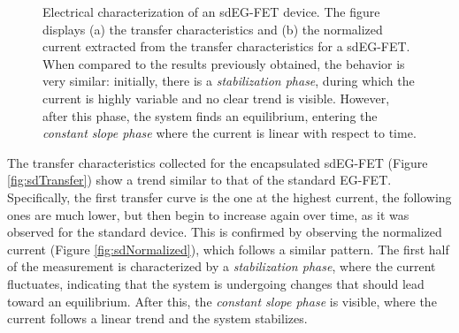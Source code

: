 \begin{figure}
    \centering
    \hfill
    \caption{Electrical characterization of an sdEG-FET device. The figure displays
    (a) the transfer characteristics and 
    (b) the normalized current extracted from the transfer characteristics for a sdEG-FET. When compared to the results previously obtained, the behavior is very similar: initially, there is a \emph{stabilization phase}, during which the current is highly variable and no clear trend is visible. However, after this phase, the system finds an equilibrium, entering the \emph{constant slope phase} where the current is linear with respect to time.}
    \label{fig:sdData}
\end{figure}

The transfer characteristics collected for the encapsulated sdEG-FET (Figure \ref{fig:sdTransfer}) show a trend similar to that of the standard EG-FET. Specifically, the first transfer curve is the one at the highest current, the following ones are much lower, but then begin to increase again over time, as it was observed for the standard device. This is confirmed by observing the normalized current (Figure \ref{fig:sdNormalized}), which follows a similar pattern. The first half of the measurement is characterized by a \emph{stabilization phase}, where the current fluctuates, indicating that the system is undergoing changes that should lead toward an equilibrium. After this, the \emph{constant slope phase} is visible, where the current follows a linear trend and the system stabilizes. 

